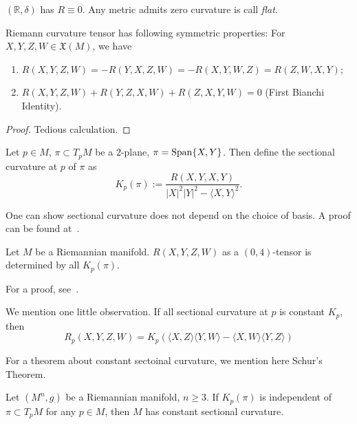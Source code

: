 \begin{eg}
    $(\mathbb{R},\delta)$ has $R\equiv 0$.
    Any metric admits zero curvature is call \emph{flat}.
\end{eg}

\begin{prop}
    Riemann curvature tensor has following symmetric properties: For $X,Y,Z,W\in\mathfrak{X}(M)$, we have
    \begin{enumerate}[(1)]
        \item $R(X,Y,Z,W)=-R(Y,X,Z,W)=-R(X,Y,W,Z)=R(Z,W,X,Y)$;
        \item $R(X,Y,Z,W)+R(Y,Z,X,W)+R(Z,X,Y,W)=0$ (First Bianchi Identity).
    \end{enumerate}
\end{prop}
\begin{proof}
    Tedious calculation.
\end{proof}

\begin{defn}
    Let $p\in M$, $\pi\subset T_pM$ be a $2$-plane, $\pi=\operatorname{Span}\{X,Y\}$.
    Then define the sectional curvature at $p$ of $\pi$ as
    \[K_p(\pi):=\frac{R(X,Y,X,Y)}{|X|^2|Y|^2-\langle X,Y\rangle^2}.\]
\end{defn}

\begin{rem}
    One can show sectional curvature does not depend on the choice of basis.
    A proof can be found at~\cite[Proposition~3.1]{doCarmo}.
\end{rem}

\begin{prop}
    Let $M$ be a Riemannian manifold.
    $R(X,Y,Z,W)$ as a $(0,4)$-tensor is determined by all $K_p(\pi)$.
\end{prop}
For a proof, see~\cite[Chapter~2.~Lemma~2]{Wu}.

We mention one little observation.
If all sectional curvature at $p$ is constant $K_p$, then
\[R_p(X,Y,Z,W)=K_p(\langle X,Z\rangle\langle Y,W\rangle-\langle X,W\rangle\langle Y,Z\rangle)\]

For a theorem about constant sectoinal curvature, we mention here Schur's Theorem.
\begin{thm}[Schur]
    Let $(M^n,g)$ be a Riemannian manifold, $n\geq 3$.
    If $K_p(\pi)$ is independent of $\pi\subset T_pM$ for any $p\in M$, then $M$ has constant sectional curvature.
\end{thm}


